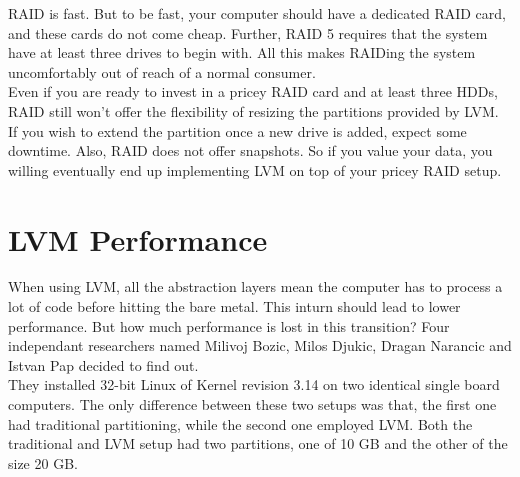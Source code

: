 RAID is fast. But to be fast, your computer should have a dedicated RAID card,
and these cards do not come cheap. Further, RAID 5 requires that the system have
at least three drives to begin with. All this makes RAIDing the system
uncomfortably out of reach of a normal consumer.\\

Even if you are ready to invest in a pricey RAID card and at least three HDDs,
RAID still won't offer the flexibility of resizing the partitions provided by
LVM. If you wish to extend the partition once a new drive is added, expect some
downtime. Also, RAID does not offer snapshots. So if you value your data, you
willing eventually end up implementing LVM on top of your pricey RAID setup.


\chapter{LVM Performance}
When using LVM, all the abstraction layers mean the computer has to process a
lot of code before hitting the bare metal. This inturn should lead to lower
performance. But how much performance is lost in this transition? Four
independant researchers named Milivoj Bozic, Milos Djukic, Dragan Narancic and
Istvan Pap decided to find out.\\

They installed 32-bit Linux of Kernel revision 3.14 on two identical single
board computers. The only difference between these two setups was that, the
first one had traditional partitioning, while the second one employed LVM. Both
the traditional and LVM setup had two partitions, one of 10 GB and the other
of the size 20 GB.\\
